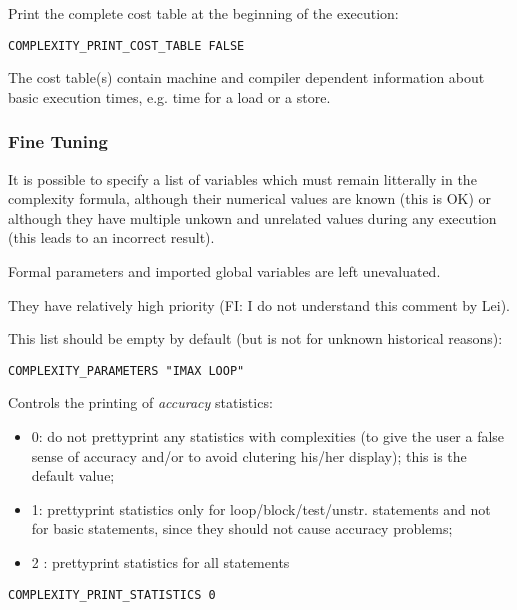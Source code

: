 Print the complete cost table at the beginning of the execution:

\begin{verbatim}
COMPLEXITY_PRINT_COST_TABLE FALSE
\end{verbatim}

The cost table(s) contain machine and compiler dependent information
about basic execution times, e.g. time for a load or a store.

\subsubsection{Fine Tuning}

It is possible to specify a list of variables which must remain
litterally in the complexity formula, although their numerical values
are known (this is OK) or although they have multiple unkown and
unrelated values during any execution (this leads to an incorrect
result).

Formal parameters and imported global variables are left unevaluated.

They have relatively high priority (FI: I do not understand this comment
by Lei).

This list should be empty by default (but is not for unknown historical
reasons):

\begin{verbatim}
COMPLEXITY_PARAMETERS "IMAX LOOP"
\end{verbatim}

Controls the printing of {\em accuracy} statistics:

\begin{itemize}

  \item 0: do not prettyprint any statistics with complexities (to give
the user a false sense of accuracy and/or to avoid clutering his/her
display); this is the default value;

  \item 1: prettyprint statistics only for loop/block/test/unstr.
statements and not for basic statements, since they should not cause
accuracy problems;

  \item 2 : prettyprint statistics for all statements

\end{itemize}

\begin{verbatim}
COMPLEXITY_PRINT_STATISTICS 0
\end{verbatim}

